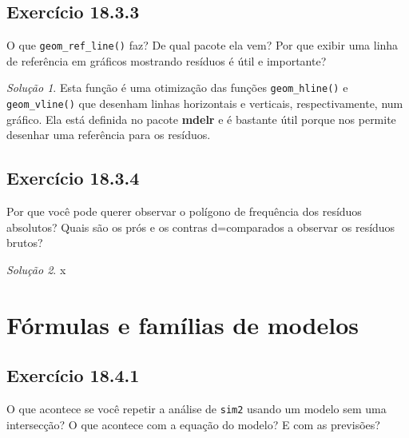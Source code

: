 \documentclass[
]{latex/krantz}
\theoremstyle{definition}
\theoremstyle{definition}
\theoremstyle{definition}
\theoremstyle{definition}
\theoremstyle{remark}
\newtheorem*{solution}{Solução}
\begin{document}
\hypertarget{exr18-3-3}{%
\subsection*{Exercício 18.3.3}\label{exr18-3-3}}

O que \texttt{geom\_ref\_line()} faz? De qual pacote ela vem? Por que exibir uma linha de referência em gráficos mostrando resíduos é útil e importante?

\begin{solution}
Esta função é uma otimização das funções \texttt{geom\_hline()} e \texttt{geom\_vline()} que desenham linhas horizontais e verticais, respectivamente, num gráfico. Ela está definida no pacote \textbf{mdelr} e é bastante útil porque nos permite desenhar uma referência para os resíduos.
\end{solution}

\hypertarget{exr18-3-4}{%
\subsection*{Exercício 18.3.4}\label{exr18-3-4}}

Por que você pode querer observar o polígono de frequência dos resíduos absolutos? Quais são os prós e os contras d=comparados a observar os resíduos brutos?

\begin{solution}
x
\end{solution}

\hypertarget{fuxf3rmulas-e-famuxedlias-de-modelos}{%
\section{Fórmulas e famílias de modelos}\label{fuxf3rmulas-e-famuxedlias-de-modelos}}

\hypertarget{exr18-4-1}{%
\subsection*{Exercício 18.4.1}\label{exr18-4-1}}

O que acontece se você repetir a análise de \texttt{sim2} usando um modelo sem uma intersecção? O que acontece com a equação do modelo? E com as previsões?
\end{document}
